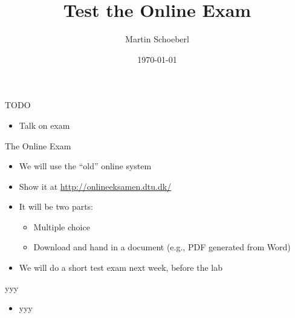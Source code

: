 

\newif\ifbook


\title{Test the Online Exam}
\author{Martin Schoeberl}
\date{\today}



\begin{frame}
\titlepage
\end{frame}


\begin{frame}[fragile]{TODO}
\begin{itemize}
\item Talk on exam
\end{itemize}
\end{frame}


\begin{frame}[fragile]{The Online Exam}
\begin{itemize}
\item We will use the ``old'' online system
\item Show it at \url{http://onlineeksamen.dtu.dk/}
\item It will be two parts:
\begin{itemize}
\item Multiple choice
\item Download and hand in a document (e.g., PDF generated from Word)
\end{itemize}
\item We will do a short test exam next week, before the lab
\end{itemize}
\end{frame}

\begin{frame}[fragile]{yyy}
\begin{itemize}
\item yyy
\end{itemize}
\end{frame}






